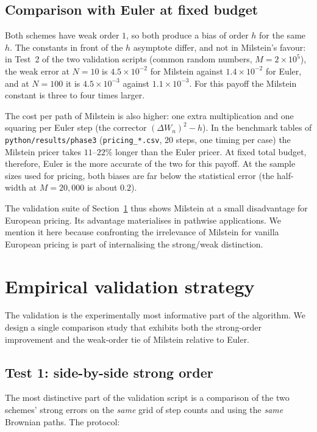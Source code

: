 \documentclass[11pt,a4paper]{article}
\theoremstyle{plain}
\theoremstyle{definition}
\theoremstyle{remark}
\begin{document}
\subsection{Comparison with Euler at fixed budget}

Both schemes have weak order $1$, so both produce a bias of order $h$
for the same $h$. The constants in front of the $h$ asymptote differ,
and not in Milstein's favour: in Test~2 of the two validation scripts
(common random numbers, $M = 2 \times 10^5$), the weak error at
$N = 10$ is $4.5 \times 10^{-2}$ for Milstein against
$1.4 \times 10^{-2}$ for Euler, and at $N = 100$ it is
$4.5 \times 10^{-3}$ against $1.1 \times 10^{-3}$. For this payoff the
Milstein constant is three to four times larger.

The cost per path of Milstein is also higher: one extra
multiplication and one squaring per Euler step (the corrector
$(\Delta W_n)^2 - h$). In the benchmark tables of
\texttt{python/results/phase3} (\texttt{pricing\_*.csv}, $20$ steps,
one timing per case) the Milstein pricer takes $11$--$22\%$ longer
than the Euler pricer. At fixed
total budget, therefore, Euler is the more accurate of the two for
this payoff. At the sample sizes used for pricing, both biases are
far below the statistical error (the half-width at $M = 20{,}000$ is
about $0.2$).

The validation suite of Section~\ref{sec:validation} thus shows Milstein
at a small disadvantage for European pricing. Its advantage
materialises in pathwise applications.
We mention it here because confronting the irrelevance of Milstein
for vanilla European pricing is part of internalising the strong/weak
distinction.

\section{Empirical validation strategy}
\label{sec:validation}

The validation is the experimentally most informative part of the
algorithm. We design a single comparison study that exhibits both
the strong-order improvement and the weak-order tie of Milstein
relative to Euler.

\subsection{Test 1: side-by-side strong order}

The most distinctive part of the validation script is a comparison
of the two schemes' strong errors on the \emph{same} grid of step
counts and using the \emph{same} Brownian paths. The protocol:
\end{document}
